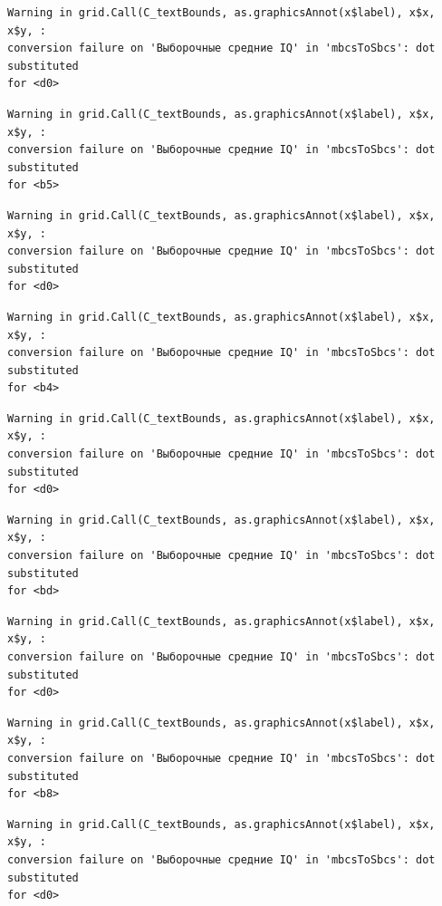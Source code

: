 \documentclass[
  letterpaper,
]{scrbook}
\theoremstyle{definition}
\theoremstyle{remark}
\begin{document}
\begin{verbatim}
Warning in grid.Call(C_textBounds, as.graphicsAnnot(x$label), x$x, x$y, :
conversion failure on 'Выборочные средние IQ' in 'mbcsToSbcs': dot substituted
for <d0>
\end{verbatim}

\begin{verbatim}
Warning in grid.Call(C_textBounds, as.graphicsAnnot(x$label), x$x, x$y, :
conversion failure on 'Выборочные средние IQ' in 'mbcsToSbcs': dot substituted
for <b5>
\end{verbatim}

\begin{verbatim}
Warning in grid.Call(C_textBounds, as.graphicsAnnot(x$label), x$x, x$y, :
conversion failure on 'Выборочные средние IQ' in 'mbcsToSbcs': dot substituted
for <d0>
\end{verbatim}

\begin{verbatim}
Warning in grid.Call(C_textBounds, as.graphicsAnnot(x$label), x$x, x$y, :
conversion failure on 'Выборочные средние IQ' in 'mbcsToSbcs': dot substituted
for <b4>
\end{verbatim}

\begin{verbatim}
Warning in grid.Call(C_textBounds, as.graphicsAnnot(x$label), x$x, x$y, :
conversion failure on 'Выборочные средние IQ' in 'mbcsToSbcs': dot substituted
for <d0>
\end{verbatim}

\begin{verbatim}
Warning in grid.Call(C_textBounds, as.graphicsAnnot(x$label), x$x, x$y, :
conversion failure on 'Выборочные средние IQ' in 'mbcsToSbcs': dot substituted
for <bd>
\end{verbatim}

\begin{verbatim}
Warning in grid.Call(C_textBounds, as.graphicsAnnot(x$label), x$x, x$y, :
conversion failure on 'Выборочные средние IQ' in 'mbcsToSbcs': dot substituted
for <d0>
\end{verbatim}

\begin{verbatim}
Warning in grid.Call(C_textBounds, as.graphicsAnnot(x$label), x$x, x$y, :
conversion failure on 'Выборочные средние IQ' in 'mbcsToSbcs': dot substituted
for <b8>
\end{verbatim}

\begin{verbatim}
Warning in grid.Call(C_textBounds, as.graphicsAnnot(x$label), x$x, x$y, :
conversion failure on 'Выборочные средние IQ' in 'mbcsToSbcs': dot substituted
for <d0>
\end{verbatim}
\end{document}
